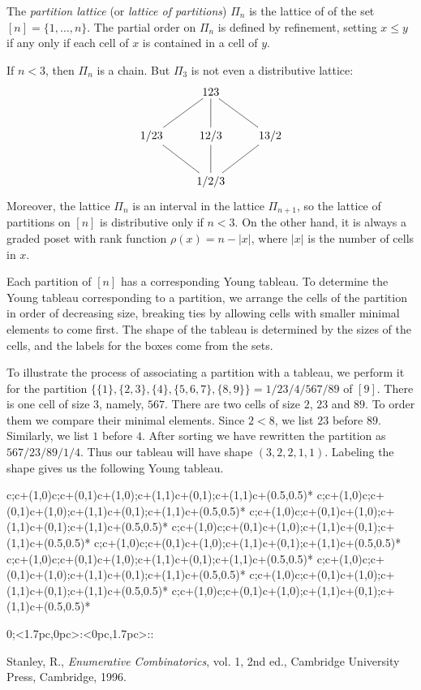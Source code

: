 \documentclass[12pt]{article}
\makeatletter
\def\drawsqlat{%
\begin{xy}{
0;<1.7pc,0pc>:<0pc,1.7pc>::
\xylattice{0}{9}{0}{9}}
\end{xy}}
\def\drawsq{\ar@{-}c;c+(1,0)\ar@{-}c;c+(0,1)\ar@{-}c+(1,0);c+(1,1)\ar@{-}c+(0,1);c+(1,1)}
\def\drawsqlabel#1{\save c+(0.5,0.5)*\txt<2pc>{#1} \restore}
\makeatother
\begin{document}
The \emph{partition lattice} (or \emph{lattice of partitions}) $\Pi_n$ is the lattice of  of the set $[n]=\{1,\dots,n\}$.  The partial order on $\Pi_n$ is defined by refinement, setting $x\le y$ if any only if each cell of $x$ is contained in a cell of $y$.

If $n<3$, then $\Pi_n$ is a chain.  But $\Pi_3$ is not even a distributive lattice:
\[\xymatrix{
& 123\ar@{-}[ld]\ar@{-}[d]\ar@{-}[rd] & \\
1/23\ar@{-}[rd] & 12/3\ar@{-}[d] & 13/2\ar@{-}[ld] \\
& 1/2/3 &
}\]
Moreover, the lattice $\Pi_n$ is an interval in the lattice $\Pi_{n+1}$, so the lattice of partitions on $[n]$ is distributive only if $n<3$.  On the other hand, it is always a graded poset with rank function
$\rho(x)=n-|x|$, where $|x|$ is the number of cells in $x$.

Each partition of $[n]$ has a corresponding Young tableau.  To determine the Young tableau corresponding to a partition, we arrange the cells of the partition in order of decreasing size, breaking ties by allowing cells with smaller minimal elements to come first.  The shape of the tableau is determined by the sizes of the cells, and the labels for the boxes come from the sets.

To illustrate the process of associating a partition with a tableau, we perform it for the partition $\{\{1\},\{2,3\},\{4\},\{5,6,7\},\{8,9\}\}=1/23/4/567/89$ of $[9]$.  There is one cell of size $3$, namely, $567$.  There are two cells of size $2$, $23$ and $89$.  To order them we compare their minimal elements.  Since $2<8$, we list $23$ before $89$.  Similarly, we list $1$ before $4$.  After sorting we have rewritten the partition as $567/23/89/1/4$.  Thus our tableau will have shape $(3,2,2,1,1)$.  Labeling the shape gives us the following Young tableau.

\begin{center}
\begin{renewcommand}{\latticebody}{%
\ifnum{} \ifnum{} \drawsq\drawsqlabel{5} \fi\fi
\ifnum{} \ifnum{} \drawsq\drawsqlabel{6} \fi\fi
\ifnum{} \ifnum{} \drawsq\drawsqlabel{7} \fi\fi
\ifnum{} \ifnum{} \drawsq\drawsqlabel{2} \fi\fi
\ifnum{} \ifnum{} \drawsq\drawsqlabel{3} \fi\fi
\ifnum{} \ifnum{} \drawsq\drawsqlabel{8} \fi\fi
\ifnum{} \ifnum{} \drawsq\drawsqlabel{9} \fi\fi
\ifnum{} \ifnum{} \drawsq\drawsqlabel{1} \fi\fi
\ifnum{} \ifnum{} \drawsq\drawsqlabel{4} \fi\fi
}
\drawsqlat
\end{renewcommand}
\end{center}

\begin{thebibliography}{99}
Stanley, R., \emph{Enumerative Combinatorics}, vol. 1, 2nd ed., Cambridge
University Press, Cambridge, 1996.
\end{thebibliography}

\end{document}
